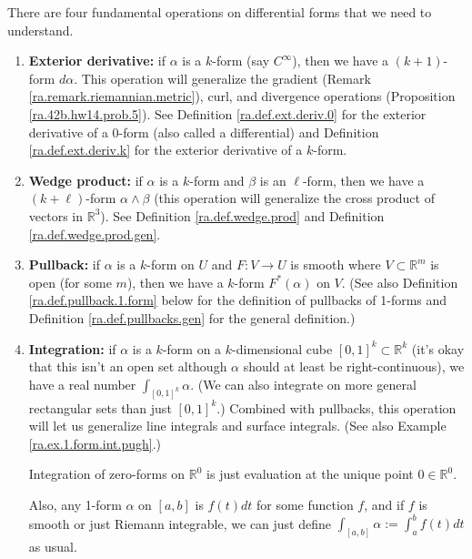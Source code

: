 There are four fundamental operations on differential forms that we need to understand.

\begin{enumerate}

\item \textbf{Exterior derivative:} if \(\alpha\) is a \(k\)-form (say \(C^\infty\)), then we have a \((k+1)\)-form \(d \alpha\). This operation will generalize the gradient (Remark \ref{ra.remark.riemannian.metric}), curl, and divergence operations (Proposition \ref{ra.42b.hw14.prob.5}). See Definition \ref{ra.def.ext.deriv.0} for the exterior derivative of a 0-form (also called a differential) and Definition \ref{ra.def.ext.deriv.k} for the exterior derivative of a \(k\)-form.

\item \textbf{Wedge product:} if \(\alpha\) is a \(k\)-form and \(\beta\) is an \(\ell\)-form, then we have a \((k+\ell)\)-form \(\alpha \wedge \beta\) (this operation will generalize the cross product of vectors in \(\mathbb{R}^3\)). See Definition \ref{ra.def.wedge.prod} and Definition \ref{ra.def.wedge.prod.gen}.



\item \textbf{Pullback:} if \(\alpha\) is a \(k\)-form on \(U\) and \(F: V \to U\) is smooth where \(V \subset \mathbb{R}^m\) is open (for some \(m\)), then we have a \(k\)-form \(F^*(\alpha)\) on \(V\). (See also Definition \ref{ra.def.pullback.1.form} below for the definition of pullbacks of 1-forms and Definition \ref{ra.def.pullbacks.gen} for the general definition.)



\item \textbf{Integration:} if \(\alpha\) is a \(k\)-form on a \(k\)-dimensional cube \([0,1]^k \subset \mathbb{R}^k\) (it's okay that this isn't an open set although \(\alpha\) should at least be right-continuous), we have a real number \(\int_{[0,1]^k} \alpha\). (We can also integrate on more general rectangular sets than just \([0,1]^k\).) Combined with pullbacks, this operation will let us generalize line integrals and surface integrals. (See also Example \ref{ra.ex.1.form.int.pugh}.)

\begin{example}

Integration of zero-forms on \(\mathbb{R}^0\) is just evaluation at the unique point \(0 \in \mathbb{R}^0\).

Also, any 1-form \(\alpha\) on \([a,b]\) is \(f(t) dt\) for some function \(f\), and if \(f\) is smooth or just Riemann integrable, we can just define \(\int_{[a,b]} \alpha := \int_a^b f(t) dt\) as usual.

\end{example}

\end{enumerate}

